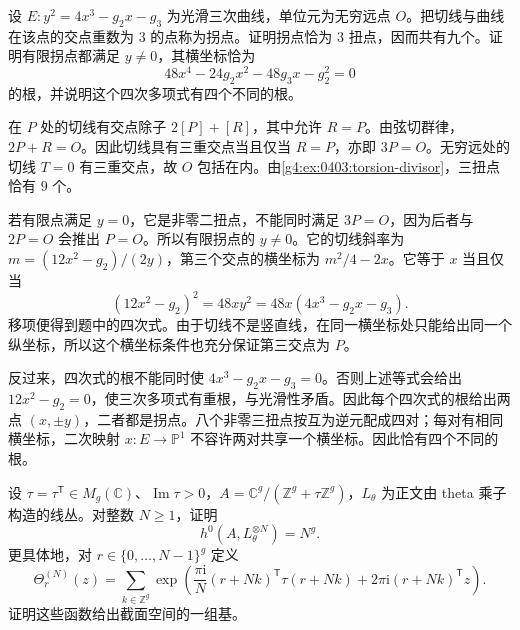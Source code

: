 \begin{exercise}
	\label{g4:ex:0405:flexes}
	设 \(E:y^2=4x^3-g_2x-g_3\) 为光滑三次曲线，单位元为无穷远点 \(O\)。把切线与曲线在该点的交点重数为 \(3\) 的点称为拐点。证明拐点恰为 \(3\) 扭点，因而共有九个。证明有限拐点都满足 \(y\ne0\)，其横坐标恰为
	\[
		48x^4-24g_2x^2-48g_3x-g_2^2=0
	\]
	的根，并说明这个四次多项式有四个不同的根。
\end{exercise}
\begin{solution}
	在 \(P\) 处的切线有交点除子 \(2[P]+[R]\)，其中允许 \(R=P\)。由弦切群律，\(2P+R=O\)。因此切线具有三重交点当且仅当 \(R=P\)，亦即 \(3P=O\)。无穷远处的切线 \(T=0\) 有三重交点，故 \(O\) 包括在内。由\cref{g4:ex:0403:torsion-divisor}，三扭点恰有 \(9\) 个。

	若有限点满足 \(y=0\)，它是非零二扭点，不能同时满足 \(3P=O\)，因为后者与 \(2P=O\) 会推出 \(P=O\)。所以有限拐点的 \(y\ne0\)。它的切线斜率为 \(m=(12x^2-g_2)/(2y)\)，第三个交点的横坐标为 \(m^2/4-2x\)。它等于 \(x\) 当且仅当
	\[
		(12x^2-g_2)^2=48xy^2=48x(4x^3-g_2x-g_3).
	\]
	移项便得到题中的四次式。由于切线不是竖直线，在同一横坐标处只能给出同一个纵坐标，所以这个横坐标条件也充分保证第三交点为 \(P\)。

	反过来，四次式的根不能同时使 \(4x^3-g_2x-g_3=0\)。否则上述等式会给出 \(12x^2-g_2=0\)，使三次多项式有重根，与光滑性矛盾。因此每个四次式的根给出两点 \((x,\pm y)\)，二者都是拐点。八个非零三扭点按互为逆元配成四对；每对有相同横坐标，二次映射 \(x:E\to\mathbb P^1\) 不容许两对共享一个横坐标。因此恰有四个不同的根。
\end{solution}
\begin{exercise}
	\label{g4:ex:0404:theta-powers}
	设 \(\tau=\tau^{\mathsf T}\in M_g(\mathbb C)\)、\(\operatorname{Im}\tau>0\)，\(A=\mathbb C^g/(\mathbb Z^g+\tau\mathbb Z^g)\)，\(L_\theta\) 为正文由 theta 乘子构造的线丛。对整数 \(N\ge1\)，证明
	\[
		h^0(A,L_\theta^{\otimes N})=N^g.
	\]
	更具体地，对 \(r\in\{0,\ldots,N-1\}^g\) 定义
	\[
		\Theta_r^{(N)}(z)
		=\sum_{k\in\mathbb Z^g}
		\exp\left(\frac{\pi\mathrm{i}}N(r+Nk)^{\mathsf T}
		\tau(r+Nk)+2\pi\mathrm{i}(r+Nk)^{\mathsf T}z\right).
	\]
	证明这些函数给出截面空间的一组基。
\end{exercise}
